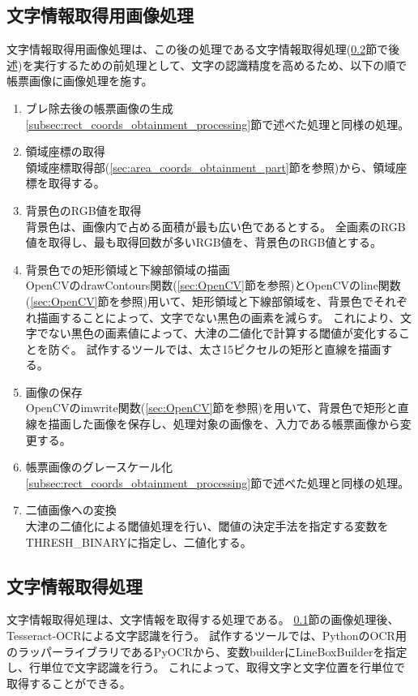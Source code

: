 \subsection{文字情報取得用画像処理}\label{subsec:image_processing_for_char_recognition}
文字情報取得用画像処理は、この後の処理である文字情報取得処理(\ref{subsec:char_information_obtainment_processing}節で後述)を実行するための前処理として、文字の認識精度を高めるため、以下の順で帳票画像に画像処理を施す。

\begin{enumerate}
    \item ブレ除去後の帳票画像の生成\\
        \ref{subsec:rect_coords_obtainment_processing}節で述べた処理と同様の処理。
    \item 領域座標の取得\\
        領域座標取得部(\ref{sec:area_coords_obtainment_part}節を参照)から、領域座標を取得する。
    \item 背景色のRGB値を取得\\
        背景色は、画像内で占める面積が最も広い色であるとする。
        全画素のRGB値を取得し、最も取得回数が多いRGB値を、背景色のRGB値とする。
    \item 背景色での矩形領域と下線部領域の描画\\
        OpenCVのdrawContours関数(\ref{sec:OpenCV}節を参照)とOpenCVのline関数(\ref{sec:OpenCV}節を参照)用いて、矩形領域と下線部領域を、背景色でそれぞれ描画することによって、文字でない黒色の画素を減らす。
        これにより、文字でない黒色の画素値によって、大津の二値化で計算する閾値が変化することを防ぐ。
        試作するツールでは、太さ15ピクセルの矩形と直線を描画する。
    \item 画像の保存\\
        OpenCVのimwrite関数(\ref{sec:OpenCV}節を参照)を用いて、背景色で矩形と直線を描画した画像を保存し、処理対象の画像を、入力である帳票画像から変更する。
    \item 帳票画像のグレースケール化\\
        \ref{subsec:rect_coords_obtainment_processing}節で述べた処理と同様の処理。
    \item 二値画像への変換\\
        大津の二値化による閾値処理を行い、閾値の決定手法を指定する変数をTHRESH\_BINARYに指定し、二値化する。
\end{enumerate}

\subsection{文字情報取得処理}\label{subsec:char_information_obtainment_processing}
文字情報取得処理は、文字情報を取得する処理である。
\ref{subsec:image_processing_for_char_recognition}節の画像処理後、Tesseract-OCRによる文字認識を行う。
試作するツールでは、PythonのOCR用のラッパーライブラリであるPyOCR\cite{PyOCR}から、変数builderにLineBoxBuilderを指定し、行単位で文字認識を行う。
これによって、取得文字と文字位置を行単位で取得することができる。

